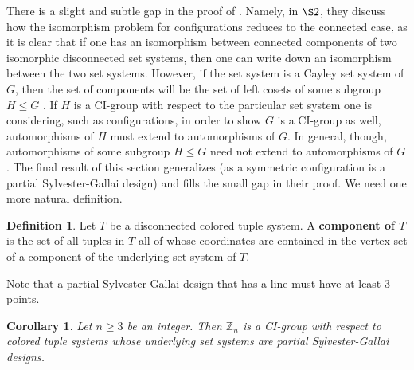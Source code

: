 \documentclass{amsart}
\newtheorem{cor}[thrm]{Corollary}
\theoremstyle{definition}
\newtheorem{definition}[thrm]{Definition}
\theoremstyle{remark}
\numberwithin{equation}{section}
\def\Z{{\mathbb Z}}
\begin{document}
There is a slight and subtle gap in the proof of \cite[Theorem 1.1]{KoikeKMM2019}.  Namely, in $\S 2$, they discuss how the isomorphism problem for configurations reduces to the connected case, as it is clear that if one has an isomorphism between connected components of two isomorphic disconnected set systems, then one can write down an isomorphism between the two set systems.  However, if the set system is a Cayley set system of $G$, then the set of components will be the set of left cosets of some subgroup $H\le G$ \cite[Example 2.3.8]{Book}.  If $H$ is a CI-group with respect to the particular set system one is considering, such as configurations, in order to show $G$ is a CI-group as well, automorphisms of $H$ must extend to automorphisms of $G$.  In general, though, automorphisms of some subgroup $H\le G$ need not extend to automorphisms of $G$.  The final result of this section generalizes \cite[Theorem 1.1]{KoikeKMM2019} (as a symmetric configuration is a partial Sylvester-Gallai design) and fills the small gap in their proof.  We need one more natural definition.

\begin{definition}
Let $T$ be a disconnected colored tuple system.  A {\bf component of $T$} is the set of all tuples in $T$ all of whose coordinates are contained in the vertex set of a component of the underlying set system of $T$.
\end{definition}

Note that a partial Sylvester-Gallai design that has a line must have at least $3$ points.

\begin{cor}
Let $n\ge 3$ be an integer.  Then $\Z_n$ is a CI-group with respect to colored tuple systems whose underlying set systems are partial Sylvester-Gallai designs.
\end{cor}
\end{document}
